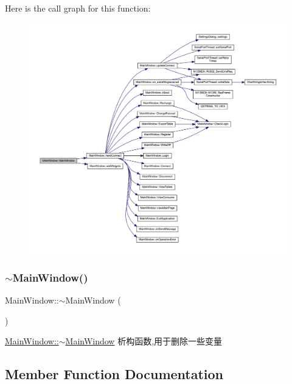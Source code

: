 Here is the call graph for this function\+:
\nopagebreak
\begin{figure}[H]
\begin{center}
\leavevmode
\includegraphics[width=350pt]{class_main_window_a8b244be8b7b7db1b08de2a2acb9409db_cgraph}
\end{center}
\end{figure}
\mbox{\label{class_main_window_ae98d00a93bc118200eeef9f9bba1dba7}} 
\subsubsection{\texorpdfstring{$\sim$MainWindow()}{~MainWindow()}}
{\footnotesize\ttfamily Main\+Window\+::$\sim$\+Main\+Window (\begin{DoxyParamCaption}{ }\end{DoxyParamCaption})}



\mbox{\hyperlink{class_main_window_ae98d00a93bc118200eeef9f9bba1dba7}{Main\+Window\+::$\sim$\+Main\+Window}} 析构函数,用于删除一些变量 



\subsection{Member Function Documentation}
\mbox{\label{class_main_window_acb789dac6a35383ad1d7bb6f652c7cee}} 
